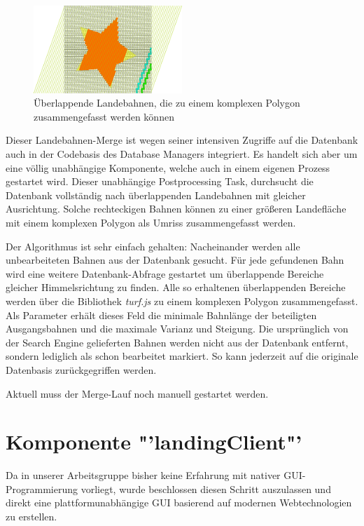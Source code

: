 \documentclass[10pt,a4paper]{report}
\begin{document}
\begin{figure}[ht]
	\centering
	\includegraphics[width=0.5\textwidth]{../Vorgehensweise/drawings/ueberlappendeBahnen.png}
	\caption{Überlappende Landebahnen, die zu einem komplexen Polygon zusammengefasst werden können}
\end{figure}
Dieser Landebahnen-Merge ist wegen seiner intensiven Zugriffe auf die Datenbank auch in der Codebasis des Database Managers integriert. Es handelt sich aber um eine völlig unabhängige Komponente, welche auch in einem eigenen Prozess gestartet wird. Dieser unabhängige Postprocessing Task, durchsucht die Datenbank vollständig nach überlappenden Landebahnen mit gleicher Ausrichtung. Solche rechteckigen Bahnen können zu einer größeren Landefläche mit einem komplexen Polygon als Umriss zusammengefasst werden. 

Der Algorithmus ist sehr einfach gehalten: Nacheinander werden alle unbearbeiteten Bahnen aus der Datenbank gesucht. Für jede gefundenen Bahn wird eine weitere Datenbank-Abfrage gestartet um überlappende Bereiche gleicher Himmelsrichtung zu finden. Alle so erhaltenen überlappenden Bereiche werden über die Bibliothek \emph{turf.js} zu einem komplexen Polygon zusammengefasst. Als Parameter erhält dieses Feld die minimale Bahnlänge der beteiligten Ausgangsbahnen und die maximale Varianz und Steigung. Die ursprünglich von der Search Engine gelieferten Bahnen werden nicht aus der Datenbank entfernt, sondern lediglich als schon bearbeitet markiert. So kann jederzeit auf die originale Datenbasis zurückgegriffen werden.

Aktuell muss der Merge-Lauf noch manuell gestartet werden.

\chapter{Komponente "'landingClient"'}

Da in unserer Arbeitsgruppe bisher keine Erfahrung mit nativer GUI-Programmierung vorliegt, wurde beschlossen diesen Schritt auszulassen und direkt eine plattformunabhängige GUI basierend auf modernen Webtechnologien zu erstellen.
\end{document}
